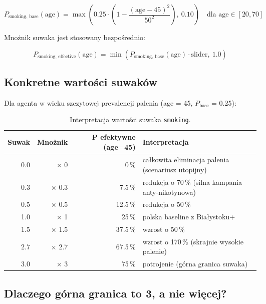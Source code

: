 \documentclass[11pt,a4paper]{article}
\begin{document}
\begin{formulabox}
\[
P_{\text{smoking, base}}(\text{age}) = \max\left( 0.25 \cdot \left(1 - \frac{(\text{age} - 45)^2}{50^2}\right),\ 0.10 \right) \quad \text{dla age} \in [20, 70]
\]
\end{formulabox}

Mnożnik suwaka jest stosowany bezpośrednio:
\begin{formulabox}
\[
P_{\text{smoking, effective}}(\text{age}) = \min\left( P_{\text{smoking, base}}(\text{age}) \cdot \text{slider},\ 1.0 \right)
\]
\end{formulabox}

\subsection{Konkretne wartości suwaków}

Dla agenta w wieku szczytowej prevalencji palenia (age = 45, $P_{\text{base}}$ = 0.25):

\begin{table}[h]
\centering
\small
\begin{tabular}{rrrl}
\toprule
\textbf{Suwak} & \textbf{Mnożnik} & \textbf{P efektywne (age=45)} & \textbf{Interpretacja} \\
\midrule
0.0 & $\times$ 0    & 0\,\%   & całkowita eliminacja palenia (scenariusz utopijny) \\
0.3 & $\times$ 0.3  & 7.5\,\% & redukcja o 70\,\% (silna kampania anty-nikotynowa) \\
0.5 & $\times$ 0.5  & 12.5\,\% & redukcja o 50\,\% \\
1.0 & $\times$ 1    & 25\,\%  & polska baseline z Białystoku+ \\
1.5 & $\times$ 1.5  & 37.5\,\% & wzrost o 50\,\% \\
2.7 & $\times$ 2.7  & 67.5\,\% & wzrost o 170\,\% (skrajnie wysokie palenie) \\
3.0 & $\times$ 3    & 75\,\%  & potrojenie (górna granica suwaka) \\
\bottomrule
\end{tabular}
\caption{Interpretacja wartości suwaka \texttt{smoking}.}
\end{table}

\subsection{Dlaczego górna granica to 3, a nie więcej?}
\end{document}
